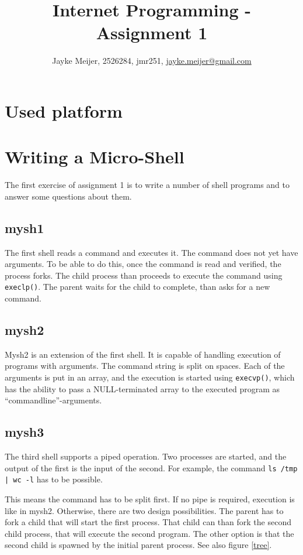 \documentclass[a4paper]{article}
\title{Internet Programming - Assignment 1}
\author{Jayke Meijer, 2526284, jmr251, \url{jayke.meijer@gmail.com}}
\begin{document}
\maketitle

\tableofcontents
\pagebreak

\section{Used platform}



\section{Writing a Micro-Shell}

The first exercise of assignment 1 is to write a number of shell programs and to answer
some questions about them.

\subsection{mysh1}

The first shell reads a command and executes it. The command does not yet have arguments.
To be able to do this, once the command is read and verified, the process forks. The child
process than proceeds to execute the command using \texttt{execlp()}. The parent waits for
the child to complete, than asks for a new command.

\subsection{mysh2}

Mysh2 is an extension of the first shell. It is capable of handling execution of programs
with arguments. The command string is split on spaces. Each of the arguments is put in an
array, and the execution is started using \texttt{execvp()}, which has the ability to pass
a NULL-terminated array to the executed program as ``commandline''-arguments.

\subsection{mysh3}

The third shell supports a piped operation. Two processes are started, and the output of
the first is the input of the second. For example, the command \texttt{ls /tmp | wc -l} 
has to be possible.

This means the command has to be split first. If no pipe is required, execution is like in
mysh2. Otherwise, there are two design possibilities. The parent has to fork a child that 
will start the first process. That child can than fork the second child process, that
will execute the second program. The other option is that the second child is spawned by
the initial parent process. See also figure \ref{tree}.
\end{document}
